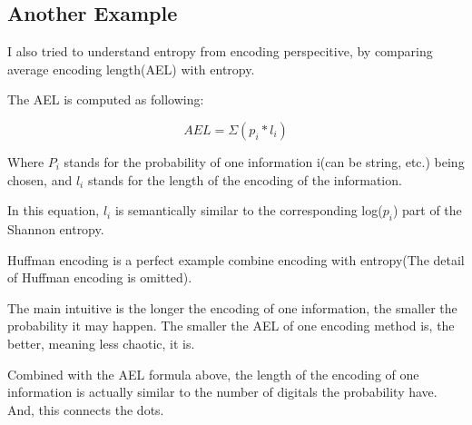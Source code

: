 \documentclass[a4paper]{article}
\begin{document}
\subsection{Another Example}

I also tried to understand entropy from encoding perspecitive, by
comparing average encoding length(AEL) with entropy.

The AEL is computed as following:

\begin{displaymath}
AEL = \Sigma(p_i * l_i)
\end{displaymath}

Where $P_i$ stands for the probability of one information i(can be
string, etc.) being chosen, and $l_i$ stands for the length of the
encoding of the information.

In this equation, $l_i$ is semantically similar to the corresponding
log($p_i$) part of the Shannon entropy.

Huffman encoding is a perfect example combine encoding with entropy(The
detail of Huffman encoding is omitted).

The main intuitive is the longer the encoding of one information, the
smaller the probability it may happen. The smaller the AEL of one
encoding method is, the better, meaning less chaotic, it is.

Combined with the AEL formula above, the length of the encoding of one
information is actually similar to the number of digitals the
probability have. And, this connects the dots.
\end{document}
